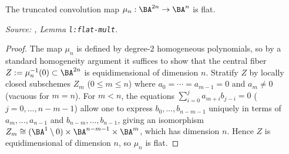 \begin{lemma}
  \label{lem:flat-multiplication}
  The truncated convolution map $\mu_n : \BA^{2n} \to \BA^n$ is flat.

  \textit{Source: \cite{hilburn-raskin}, Lemma \texttt{l:flat-mult}.}
\end{lemma}

\begin{proof}
  The map $\mu_n$ is defined by degree-$2$ homogeneous polynomials, so
  by a standard homogeneity argument it suffices to show that the central
  fiber $Z := \mu_n^{-1}(0) \subset \BA^{2n}$ is equidimensional of
  dimension $n$. Stratify $Z$ by locally closed subschemes
  $Z_m$ ($0 \leq m \leq n$) where $a_0 = \cdots = a_{m-1} = 0$ and
  $a_m \neq 0$ (vacuous for $m = n$). For $m < n$, the equations
  $\sum_{i=0}^j a_{m+i} b_{j-i} = 0$ ($j = 0,\ldots,n-m-1$) allow one
  to express $b_0,\ldots,b_{n-m-1}$ uniquely in terms of $a_m,\ldots,a_{n-1}$
  and $b_{n-m},\ldots,b_{n-1}$, giving an isomorphism
  $Z_m \cong (\BA^1 \setminus 0) \times \BA^{n-m-1} \times \BA^m$,
  which has dimension $n$. Hence $Z$ is equidimensional of dimension $n$,
  so $\mu_n$ is flat.
\end{proof}


